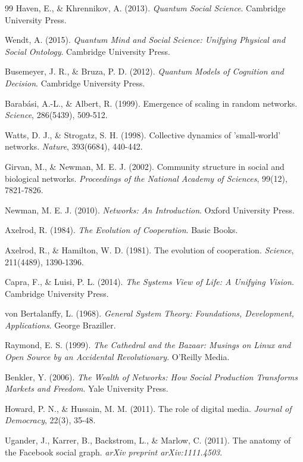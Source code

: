 \documentclass[11pt,a4paper]{article}
\begin{document}
\begin{thebibliography}{99}
Haven, E., \& Khrennikov, A. (2013). \textit{Quantum Social Science}. Cambridge University Press.

Wendt, A. (2015). \textit{Quantum Mind and Social Science: Unifying Physical and Social Ontology}. Cambridge University Press.

Busemeyer, J. R., \& Bruza, P. D. (2012). \textit{Quantum Models of Cognition and Decision}. Cambridge University Press.

Barabási, A.-L., \& Albert, R. (1999). Emergence of scaling in random networks. \textit{Science}, 286(5439), 509-512.

Watts, D. J., \& Strogatz, S. H. (1998). Collective dynamics of 'small-world' networks. \textit{Nature}, 393(6684), 440-442.

Girvan, M., \& Newman, M. E. J. (2002). Community structure in social and biological networks. \textit{Proceedings of the National Academy of Sciences}, 99(12), 7821-7826.

Newman, M. E. J. (2010). \textit{Networks: An Introduction}. Oxford University Press.

Axelrod, R. (1984). \textit{The Evolution of Cooperation}. Basic Books.

Axelrod, R., \& Hamilton, W. D. (1981). The evolution of cooperation. \textit{Science}, 211(4489), 1390-1396.

Capra, F., \& Luisi, P. L. (2014). \textit{The Systems View of Life: A Unifying Vision}. Cambridge University Press.

von Bertalanffy, L. (1968). \textit{General System Theory: Foundations, Development, Applications}. George Braziller.

Raymond, E. S. (1999). \textit{The Cathedral and the Bazaar: Musings on Linux and Open Source by an Accidental Revolutionary}. O'Reilly Media.

Benkler, Y. (2006). \textit{The Wealth of Networks: How Social Production Transforms Markets and Freedom}. Yale University Press.

Howard, P. N., \& Hussain, M. M. (2011). The role of digital media. \textit{Journal of Democracy}, 22(3), 35-48.

Ugander, J., Karrer, B., Backstrom, L., \& Marlow, C. (2011). The anatomy of the Facebook social graph. \textit{arXiv preprint arXiv:1111.4503}.


\end{thebibliography}
\end{document}
